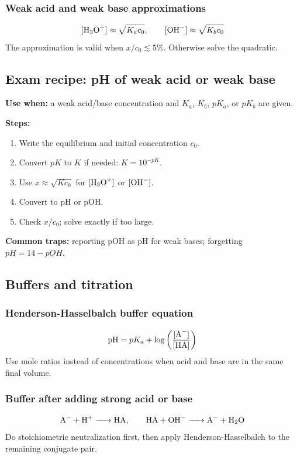 \subsubsection{Weak acid and weak base approximations}
\[
[\ce{H3O+}]\approx\sqrt{K_ac_0}, \qquad
[\ce{OH-}]\approx\sqrt{K_bc_0}
\]
The approximation is valid when \(x/c_0\lesssim5\%\). Otherwise solve the quadratic.

\subsection{Exam recipe: pH of weak acid or weak base}
\textbf{Use when:} a weak acid/base concentration and \(K_a\), \(K_b\), \(pK_a\), or \(pK_b\) are given.

\textbf{Steps:}
\begin{enumerate}
    \item Write the equilibrium and initial concentration \(c_0\).
    \item Convert \(pK\) to \(K\) if needed: \(K=10^{-pK}\).
    \item Use \(x\approx\sqrt{Kc_0}\) for \([\ce{H3O+}]\) or \([\ce{OH-}]\).
    \item Convert to pH or pOH.
    \item Check \(x/c_0\); solve exactly if too large.
\end{enumerate}

\textbf{Common traps:} reporting pOH as pH for weak bases; forgetting \(pH=14-pOH\).

\subsection{Buffers and titration}

\subsubsection{Henderson-Hasselbalch buffer equation}
\[
\mathrm{pH}=pK_a+\log\left(\frac{[\ce{A-}]}{[\ce{HA}]}\right)
\]
Use mole ratios instead of concentrations when acid and base are in the same final volume.

\subsubsection{Buffer after adding strong acid or base}
\[
\ce{A- + H+ -> HA}, \qquad
\ce{HA + OH- -> A- + H2O}
\]
Do stoichiometric neutralization first, then apply Henderson-Hasselbalch to the remaining conjugate pair.

